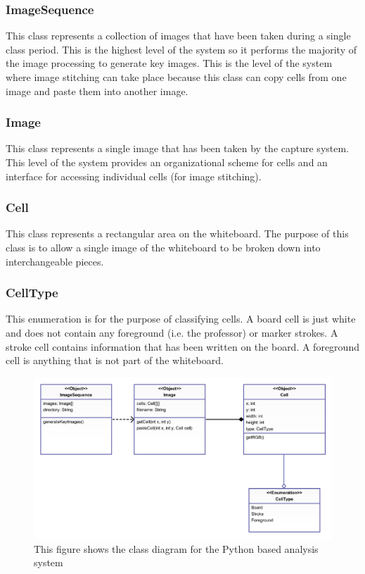\documentclass[]{article}
\begin{document}
				\subsubsection{ImageSequence}
					This class represents a collection of images that have been taken during a single class period. This is the highest level of the system so it performs the majority of the image processing to generate key images. This is the level of the system where image stitching can take place because this class can copy cells from one image and paste them into another image. 
					
				\subsubsection{Image}
					This class represents a single image that has been taken by the capture system. This level of the system provides an organizational scheme for cells and an interface for accessing individual cells (for image stitching). 
			
				\subsubsection{Cell}
					This class represents a rectangular area on the whiteboard. The purpose of this class is to allow a single image of the whiteboard to be broken down into interchangeable pieces.
					
				\subsubsection{CellType}
					This enumeration is for the purpose of classifying cells. A board cell is just white and does not contain any foreground (i.e. the professor) or marker strokes. A stroke cell contains information that has been written on the board. A foreground cell is anything that is not part of the whiteboard.
					
			
			\begin{figure}
				\centering
				\includegraphics[scale=0.5]{images/uml-analysis-system.pdf}
				\caption{This figure shows the class diagram for the Python based analysis system}
				\label{img:uml-analysis-system}
			\end{figure}
			
\end{document}
